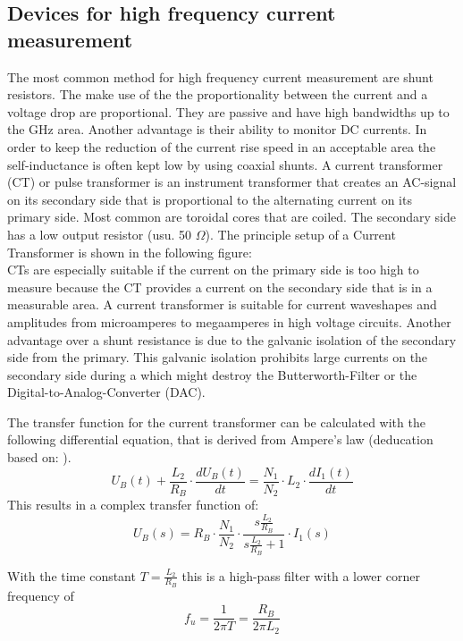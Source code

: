 \subsection{Devices for high frequency current measurement}
The most common method for high frequency current measurement are shunt resistors. The make use of the the proportionality between the current and a voltage drop are proportional. They are passive and have high bandwidths up to the GHz area. Another advantage is their ability to monitor DC currents. In order to keep the reduction of the current rise speed in an acceptable area the self-inductance is often kept low by using coaxial shunts. \cite{highdynamiccurrent}
A current transformer (CT) or pulse transformer is an instrument transformer that creates an AC-signal on its secondary side that is proportional to the alternating current on its primary side. Most common are toroidal cores that are coiled. The secondary side has a low output resistor (usu. 50 $\Omega$).
The principle setup of a Current Transformer is shown in the following figure: 
\\CTs are especially suitable if the current on the primary side is too high to measure because the CT provides a current on the secondary side that is in a measurable area. A current transformer is suitable for current waveshapes and amplitudes from microamperes to megaamperes in high voltage circuits. Another advantage over a shunt resistance is due to the galvanic isolation of the secondary side from the primary. This galvanic isolation prohibits large currents on the secondary side during a  which might destroy the Butterworth-Filter or the Digital-to-Analog-Converter (DAC). 

The transfer function for the current transformer can be calculated with the following differential equation, that is derived from Ampere's law (deducation based on: \cite{highdynamiccurrent}).
\begin{equation}
U_B(t) + \frac{L_2}{R_B} \cdot \frac{dU_B(t)}{dt}=\frac{N_1}{N_2} \cdot L_2 \cdot \frac{dI_1(t)}{dt}
\end{equation}
This results in a complex transfer function of: 
\begin{equation}
U_B(s) = R_B \cdot \frac{N_1}{N_2} \cdot \frac{s \frac{L_2}{R_B}}{s \frac{L_2}{R_B} +1} \cdot I_1(s)
\end{equation}

With the time constant $T=\frac{L_2}{R_B}$ this is a high-pass filter with a lower corner frequency of 
\begin{equation}
f_u= \frac{1}{2 \pi T} = \frac{R_B}{2 \pi L_2}
\end{equation}

